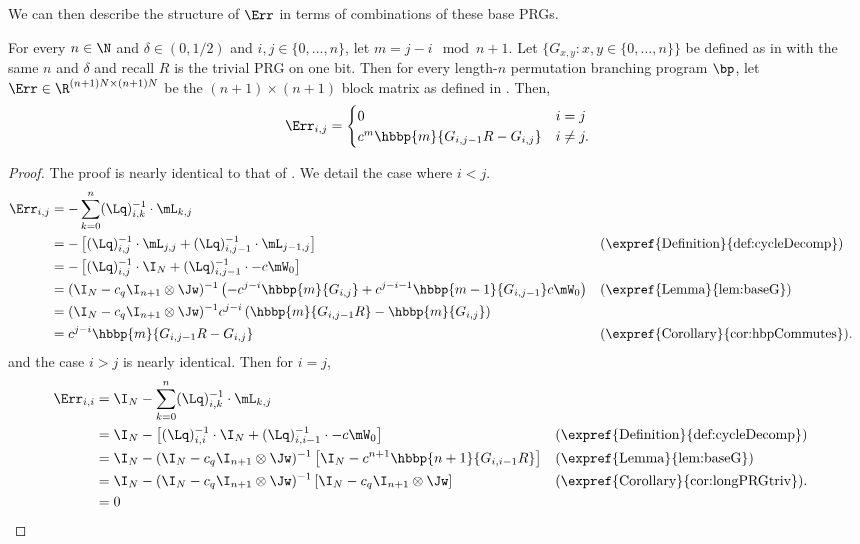 We can then describe the structure of $\Err$ in terms of combinations of these base PRGs.
\begin{lemma}\label{lem:errStruct}
For every $n\in\N$ and $\delta \in (0,1/2)$ and $i,j\in \{0,\ldots,n\}$, let $m=j-i\mod n+1$. Let $\{G_{x,y}:x,y\in\{0,\dots,n\}\}$ be defined as in  with the same $n$ and $\delta$ and recall $R$ is the trivial PRG on one bit. Then for every length-$n$ permutation branching program $\bp$, let $\Err\in \R^{(n+1)N\times (n+1)N}$ be the $(n+1)\times(n+1)$ block matrix as defined in . Then,
\[\Err_{i,j}=\begin{cases}
0 & i=j\\
c^{m}\hbbp{m}{G_{i,j-1}R-G_{i,j}} & i\neq j.
\end{cases}\]
\end{lemma}
\begin{proof}
The proof is nearly identical to that of . We detail the case where $i<j$. %
\begin{align*}
    \Err_{i,j} &= -\sum_{k=0}^{n}(\Lq)^{-1}_{i,k}\cdot \mL_{k,j}\\
    &= -\left[(\Lq)^{-1}_{i,j}\cdot\mL_{j,j}+(\Lq)^{-1}_{i,j-1}\cdot\mL_{j-1,j}\right] && \text{(\expref{Definition}{def:cycleDecomp})}\\
    &= -\left[(\Lq)^{-1}_{i,j}\cdot\I_{N}+(\Lq)^{-1}_{i,j-1}\cdot-c\mW_0\right]\\
    &=  (\I_N-c_q\I_{n+1}\otimes\Jw)^{-1}\left(-c^{j-i}\hbbp{m}{G_{i,j}} + c^{j-i-1}\hbbp{m-1}{G_{i,j-1}}c\mW_0\right) && \text{(\expref{Lemma}{lem:baseG})}\\
    &= (\I_N-c_q\I_{n+1}\otimes\Jw)^{-1}c^{j-i}\left(\hbbp{m}{G_{i,j-1}R}-\hbbp{m}{G_{i,j}}\right)\\
    &= c^{j-i}\hbbp{m}{G_{i,j-1}R-G_{i,j}} && \text{(\expref{Corollary}{cor:hbpCommutes}).}
\end{align*}
and the case $i>j$ is nearly identical. Then for $i=j$,
\begin{align*}
    \Err_{i,i} &= \I_N-\sum_{k=0}^{n}(\Lq)^{-1}_{i,k}\cdot \mL_{k,j}\\
    &= \I_N -\left[(\Lq)^{-1}_{i,i}\cdot\I_{N}+(\Lq)^{-1}_{i,i-1}\cdot-c\mW_0\right] && \text{(\expref{Definition}{def:cycleDecomp})}\\ 
    &= \I_N -(\I_N-c_q\I_{n+1}\otimes\Jw)^{-1}\left[\I_N-c^{n+1}\hbbp{n+1}{G_{i,i-1}R}\right]&& \text{(\expref{Lemma}{lem:baseG})}\\
    &= \I_N-(\I_N-c_q\I_{n+1}\otimes\Jw)^{-1}\left[\I_N-c_q\I_{n+1}\otimes\Jw\right] && \text{(\expref{Corollary}{cor:longPRGtriv}).}\\
    &= 0 && \qedhere
\end{align*}
\end{proof}

